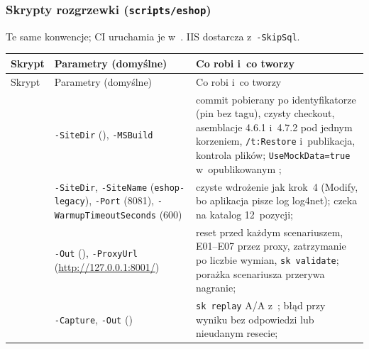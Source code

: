 
\subsubsection{Skrypty rozgrzewki (\texttt{scripts/eshop})}\label{sec:bench-skrypty-eshop}

Te same konwencje; CI uruchamia je w~. IIS dostarcza
 z~\texttt{-SkipSql}.

{\footnotesize
\begin{xltabular}{\linewidth}{@{}>{\raggedright\arraybackslash}p{3.3cm} >{\raggedright\arraybackslash}p{3.9cm} >{\raggedright\arraybackslash}X@{}}
\toprule
Skrypt & Parametry (domyślne) & Co robi i~co tworzy \\
\midrule
\endfirsthead
\toprule
Skrypt & Parametry (domyślne) & Co robi i~co tworzy \\
\midrule
\endhead
\bottomrule
\endlastfoot
{} & \texttt{-SiteDir} (),
  \texttt{-MSBuild} & commit pobierany po identyfikatorze (pin bez tagu), czysty checkout,
  asemblacje 4.6.1 i~4.7.2 pod jednym korzeniem, \texttt{/t:Restore} i~publikacja,
  kontrola plików; \texttt{UseMockData=true} w~opublikowanym ;
   \\
 & \texttt{-SiteDir}, \texttt{-SiteName} (\texttt{eshop-legacy}),
  \texttt{-Port} (8081), \texttt{-WarmupTimeoutSeconds} (600) & czyste wdrożenie jak
  krok~4 (Modify, bo aplikacja pisze log log4net); czeka na katalog 12~pozycji;
   \\
 & \texttt{-Out} (),
  \texttt{-ProxyUrl} (\url{http://127.0.0.1:8001/}) & reset przed każdym scenariuszem,
  E01--E07 przez proxy, zatrzymanie po liczbie wymian, \texttt{sk validate}; porażka
  scenariusza przerywa nagranie;  \\
 & \texttt{-Capture}, \texttt{-Out} ()
  & \texttt{sk replay} A/A z~; błąd przy wyniku bez
  odpowiedzi lub nieudanym resecie;  \\

\end{xltabular}}
